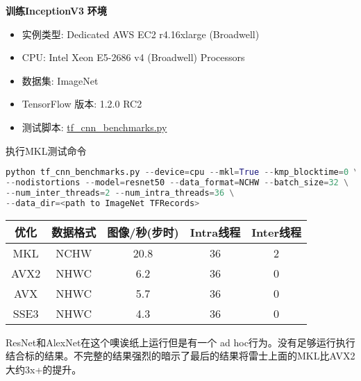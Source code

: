 \textbf{训练InceptionV3}\newline
\textbf{环境}
\begin{itemize}
	\item 实例类型: Dedicated AWS EC2 r4.16xlarge (Broadwell)
	\item CPU: Intel Xeon E5-2686 v4 (Broadwell) Processors
	\item 数据集: ImageNet
	\item TensorFlow 版本: 1.2.0 RC2
	\item 测试脚本: \href{https://github.com/tensorflow/benchmarks/blob/mkl_experiment/scripts/tf_cnn_benchmarks/tf_cnn_benchmarks.py}{tf\_cnn\_benchmarks.py}
\end{itemize}

执行MKL测试命令
\begin{lstlisting}[language=Python]
python tf_cnn_benchmarks.py --device=cpu --mkl=True --kmp_blocktime=0 \
--nodistortions --model=resnet50 --data_format=NCHW --batch_size=32 \
--num_inter_threads=2 --num_intra_threads=36 \
--data_dir=<path to ImageNet TFRecords>
\end{lstlisting}
\begin{tabular}{|c|c|c|c|c|}
\hline
优化&数据格式&图像/秒(步时)&Intra线程&Inter线程\\
\hline
MKL&	NCHW&	20.8&	36&	2\\
\hline
AVX2&	NHWC&	6.2&	36&	0\\
\hline
AVX&	NHWC&	5.7&	36&	0\\
\hline
SSE3&	NHWC&	4.3&	36&	0\\
\hline
\end{tabular}
ResNet和AlexNet在这个噢诶纸上运行但是有一个 ad hoc行为。没有足够运行执行结合标的结果。不完整的结果强烈的暗示了最后的结果将雷士上面的MKL比AVX2大约3x+的提升。